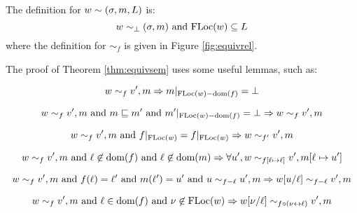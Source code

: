 The definition for $w\sim(\sigma,m,L)$ is:
\[w\sim_\bot(\sigma,m)\text{ and }\text{FLoc}(w)\subseteq L\]
where the definition for $\sim_f$ is given in Figure \ref{fig:equivrel}.

The proof of Theorem \ref{thm:equivsem} uses some useful lemmas, such as:
\begin{lem}
  \[w\sim_f v',m\Rightarrow m|_{\text{FLoc}(w)-\text{dom}(f)}=\bot\]
\end{lem}

\begin{lem}
  \[w\sim_f v',m\text{ and }m\sqsubseteq m'\text{ and }m'|_{\text{FLoc}(w)-\text{dom}(f)}=\bot\Rightarrow w\sim_f v',m\]
\end{lem}

\begin{lem}
  \[w\sim_f v',m\text{ and }f|_{\text{FLoc}(w)}=f|_{\text{FLoc}(w)}\Rightarrow w\sim_{f'}v',m\]
\end{lem}

\begin{lem}
  \[w\sim_f v',m\text{ and }\ell\not\in\text{dom}(f)\text{ and }\ell\not\in\text{dom}(m)\Rightarrow\forall u',w\sim_{f[\ell\mapsto\ell]}v',m[\ell\mapsto u']\]
\end{lem}

\begin{lem}
  \[w\sim_f v',m\text{ and }f(\ell)=\ell'\text{ and }m(\ell')=u'\text{ and }u\sim_{f-\ell}u',m\Rightarrow w[u/\ell]\sim_{f-\ell}v',m\]
\end{lem}

\begin{lem}
  \[w\sim_f v',m\text{ and }\ell\in\text{dom}(f)\text{ and }\nu\not\in\text{FLoc}(w)\Rightarrow w[\nu/\ell]\sim_{f\circ(\nu\leftrightarrow\ell)}v',m\]
\end{lem}
